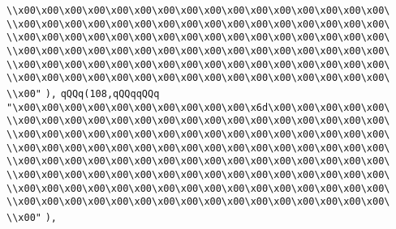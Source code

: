\verb|\\x00\x00\x00\x00\x00\x00\x00\x00\x00\x00\x00\x00\x00\x00\x00\x00\|\newline
\verb|\\x00\x00\x00\x00\x00\x00\x00\x00\x00\x00\x00\x00\x00\x00\x00\x00\|\newline
\verb|\\x00\x00\x00\x00\x00\x00\x00\x00\x00\x00\x00\x00\x00\x00\x00\x00\|\newline
\verb|\\x00\x00\x00\x00\x00\x00\x00\x00\x00\x00\x00\x00\x00\x00\x00\x00\|\newline
\verb|\\x00\x00\x00\x00\x00\x00\x00\x00\x00\x00\x00\x00\x00\x00\x00\x00\|\newline
\verb|\\x00\x00\x00\x00\x00\x00\x00\x00\x00\x00\x00\x00\x00\x00\x00\x00\|\newline
\verb|\\x00"|\newline
\verb|),|\newline
\verb|qQQq(108,qQQqqQQq|\newline
\verb|"\x00\x00\x00\x00\x00\x00\x00\x00\x00\x00\x6d\x00\x00\x00\x00\x00\|\newline
\verb|\\x00\x00\x00\x00\x00\x00\x00\x00\x00\x00\x00\x00\x00\x00\x00\x00\|\newline
\verb|\\x00\x00\x00\x00\x00\x00\x00\x00\x00\x00\x00\x00\x00\x00\x00\x00\|\newline
\verb|\\x00\x00\x00\x00\x00\x00\x00\x00\x00\x00\x00\x00\x00\x00\x00\x00\|\newline
\verb|\\x00\x00\x00\x00\x00\x00\x00\x00\x00\x00\x00\x00\x00\x00\x00\x00\|\newline
\verb|\\x00\x00\x00\x00\x00\x00\x00\x00\x00\x00\x00\x00\x00\x00\x00\x00\|\newline
\verb|\\x00\x00\x00\x00\x00\x00\x00\x00\x00\x00\x00\x00\x00\x00\x00\x00\|\newline
\verb|\\x00\x00\x00\x00\x00\x00\x00\x00\x00\x00\x00\x00\x00\x00\x00\x00\|\newline
\verb|\\x00"|\newline
\verb|),|\newline
